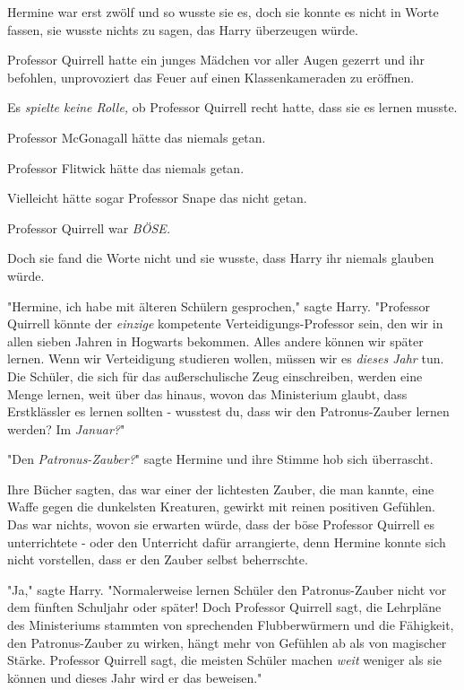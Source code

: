 {Hermine war erst zwölf und so wusste sie es, doch sie konnte es nicht in Worte fassen, sie wusste nichts zu sagen, das Harry überzeugen würde.

Professor Quirrell hatte ein junges Mädchen vor aller Augen gezerrt und ihr befohlen, unprovoziert das Feuer auf einen Klassenkameraden zu eröffnen.

Es \emph{spielte keine Rolle,} ob Professor Quirrell recht hatte, dass sie es lernen musste.

Professor McGonagall hätte das niemals getan.

Professor Flitwick hätte das niemals getan.

Vielleicht hätte sogar Professor Snape das nicht getan.

Professor Quirrell war \emph{BÖSE.}

Doch sie fand die Worte nicht und sie wusste, dass Harry ihr niemals glauben würde.

"Hermine, ich habe mit älteren Schülern gesprochen," sagte Harry. "Professor Quirrell könnte der \emph{einzige} kompetente Verteidigungs-Professor sein, den wir in allen sieben Jahren in Hogwarts bekommen. Alles andere können wir später lernen. Wenn wir Verteidigung studieren wollen, müssen wir es \emph{dieses Jahr} tun. Die Schüler, die sich für das außerschulische Zeug einschreiben, werden eine Menge lernen, weit über das hinaus, wovon das Ministerium glaubt, dass Erstklässler es lernen sollten - wusstest du, dass wir den Patronus-Zauber lernen werden? Im \emph{Januar?}"

"Den \emph{Patronus-Zauber?}" sagte Hermine und ihre Stimme hob sich überrascht.

Ihre Bücher sagten, das war einer der lichtesten Zauber, die man kannte, eine Waffe gegen die dunkelsten Kreaturen, gewirkt mit reinen positiven Gefühlen. Das war nichts, wovon sie erwarten würde, dass der böse Professor Quirrell es unterrichtete - oder den Unterricht dafür arrangierte, denn Hermine konnte sich nicht vorstellen, dass er den Zauber selbst beherrschte.

"Ja," sagte Harry. "Normalerweise lernen Schüler den Patronus-Zauber nicht vor dem fünften Schuljahr oder später! Doch Professor Quirrell sagt, die Lehrpläne des Ministeriums stammten von sprechenden Flubberwürmern und die Fähigkeit, den Patronus-Zauber zu wirken, hängt mehr von Gefühlen ab als von magischer Stärke. Professor Quirrell sagt, die meisten Schüler machen \emph{weit} weniger als sie können und dieses Jahr wird er das beweisen."

}
